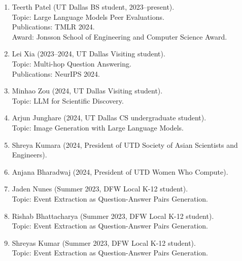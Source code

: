 \begin{enumerate}[label={},leftmargin=15pt]

\item \noindent Teerth Patel (UT Dallas BS student, 2023--present). \\
Topic: Large Language Models Peer Evaluations.  \\
Publications: TMLR 2024. \\
Award: Jonsson School of Engineering and Computer Science Award.

\vspace{1mm}
\item Lei Xia (2023--2024, UT Dallas Visiting student). \\
Topic: Multi-hop Question Answering. \\
Publications: NeurIPS 2024.

\vspace{1mm}
\item Minhao Zou (2024, UT Dallas Visiting student). \\
Topic: LLM for Scientific Discovery.

\vspace{1mm}
\item Arjun Junghare (2024, UT Dallas CS undergraduate student). \\
Topic: Image Generation with Large Language Models.


\vspace{1mm}
\item Shreya Kumara (2024, President of UTD Society of Asian Scientists and Engineers).

\vspace{1mm}
\item Anjana Bharadwaj (2024, President of UTD Women Who Compute).


\vspace{1mm}
\item Jaden Nunes (Summer 2023, DFW Local K-12 student). \\
Topic: Event Extraction as Question-Answer Pairs Generation.

\vspace{1mm}
\item Rishab Bhattacharya (Summer 2023, DFW Local K-12 student). \\
Topic: Event Extraction as Question-Answer Pairs Generation.

\vspace{1mm}
\item Shreyas Kumar (Summer 2023, DFW Local K-12 student). \\
Topic: Event Extraction as Question-Answer Pairs Generation. 



\end{enumerate}
